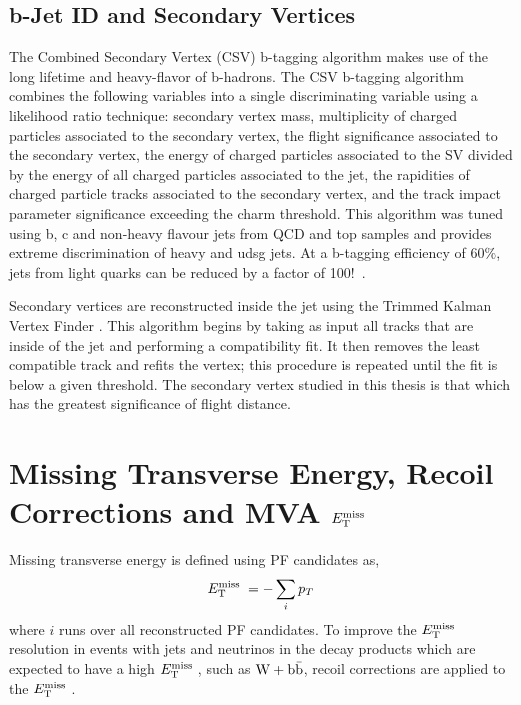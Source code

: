 \subsection{b-Jet ID and Secondary Vertices}
The Combined Secondary Vertex (CSV) b-tagging algorithm makes use
of the long lifetime and heavy-flavor of b-hadrons.
The CSV b-tagging algorithm combines the following variables into a single discriminating
variable using a likelihood ratio technique: secondary vertex mass, multiplicity of charged
particles associated to the secondary vertex, the flight significance associated to the
secondary vertex, the energy of charged particles associated to the SV divided by the energy
of all charged particles associated to the jet, the rapidities of charged particle tracks associated
to the secondary vertex, and the track impact parameter significance exceeding the charm threshold.
This algorithm was tuned
using b, c and non-heavy flavour jets from QCD and top samples and provides extreme discrimination
of heavy and udsg jets. At a b-tagging efficiency of 60$\%$, jets from light quarks can be reduced
by a factor of 100!~\cite{refCSV}.

Secondary vertices are reconstructed inside the jet using the Trimmed Kalman Vertex Finder \cite{KalmanFilter}.
This algorithm begins by taking as input all tracks that are inside of the jet and performing a compatibility fit. It then removes the least compatible track and refits the vertex; this procedure is repeated until
the fit is below a given threshold. The secondary vertex studied in this thesis is that which has
the greatest significance of flight distance.

\section{Missing Transverse Energy, Recoil Corrections and MVA $E_\mathrm{T}^{\mathrm{miss}}\;$}
Missing transverse energy is defined using PF candidates as,
\begin{equation}%
\MET = -\sum_{i} p_{T}
\end{equation}
where $i$ runs over all reconstructed PF candidates. 
To improve the $E_\mathrm{T}^{\mathrm{miss}}\;$ resolution in 
events with jets and neutrinos in the decay products 
which are expected to have a high $E_\mathrm{T}^{\mathrm{miss}}\;$, such as $\mathrm{W+\mathrm{b\bar{b}}}$,
recoil corrections are applied to the $E_\mathrm{T}^{\mathrm{miss}}\;$. 

